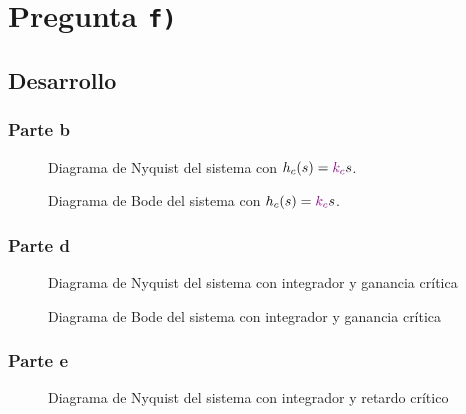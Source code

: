 \section{Pregunta \texttt{f)}}\label{pregunta-f}


\subsection{Desarrollo}

\subsubsection{Parte b}

\begin{figure}[h]
  \centering
  
  \caption{Diagrama de Nyquist del sistema con $h_{c}(s) = \mathbin{\color{violet}k_{c}}\mathbin{s}$.}
  \label{fig:nyquist-f1}
\end{figure}

\begin{figure}[h]
  \centering
  
  \caption{Diagrama de Bode del sistema con $h_{c}(s) = \mathbin{\color{violet}k_{c}}\mathbin{s}$.}
  \label{fig:bode-f1}
\end{figure}

\subsubsection{Parte d}

\begin{figure}[h]
  \centering
  
  \caption{Diagrama de Nyquist del sistema con integrador y ganancia crítica}
  \label{fig:nyquist-f2}
\end{figure}

\begin{figure}[h]
  \centering
  
  \caption{Diagrama de Bode del sistema con integrador y ganancia crítica}
  \label{fig:bode-f2}
\end{figure}

\subsubsection{Parte e}

\begin{figure}[h]
  \centering
  
  \caption{Diagrama de Nyquist del sistema con integrador y retardo crítico}
  \label{fig:nyquist-f3}
\end{figure}

